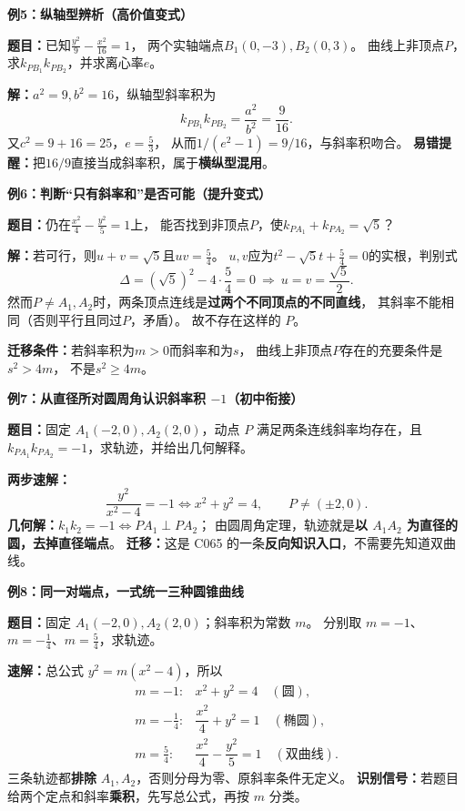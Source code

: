 \begin{examplebox}
\medskip
\textbf{\textcolor{CExample}{例5：纵轴型辨析（高价值变式）}}

\textbf{题目：}已知\(\frac{y^2}{9}-\frac{x^2}{16}=1\)，
两个实轴端点\(B_1(0,-3),B_2(0,3)\)。
曲线上非顶点\(P\)，求\(k_{PB_1}k_{PB_2}\)，并求离心率\(e\)。

\textbf{解：}\(a^2=9,b^2=16\)，纵轴型斜率积为
\[
 \boxed{k_{PB_1}k_{PB_2}=\frac{a^2}{b^2}=\frac9{16}}.
\]
又\(c^2=9+16=25\)，\(\boxed{e=\frac53}\)，
从而\(1/(e^2-1)=9/16\)，与斜率积吻合。
\textbf{易错提醒：}把\(16/9\)直接当成斜率积，属于\textbf{横纵型混用}。

\medskip
\textbf{\textcolor{CExample}{例6：判断“只有斜率和”是否可能（提升变式）}}

\textbf{题目：}仍在\(\frac{x^2}{4}-\frac{y^2}{5}=1\)上，
能否找到非顶点\(P\)，使\(k_{PA_1}+k_{PA_2}=\sqrt5\)？

\textbf{解：}若可行，则\(u+v=\sqrt5\)且\(uv=\frac54\)。
\(u,v\)应为\(t^2-\sqrt5t+\frac54=0\)的实根，判别式
\[
 \Delta=(\sqrt5)^2-4\cdot\frac54=0
 \ \Longrightarrow\ u=v=\frac{\sqrt5}{2}.
\]
然而\(P\ne A_1,A_2\)时，两条顶点连线是\textbf{过两个不同顶点的不同直线}，
其斜率不能相同（否则平行且同过\(P\)，矛盾）。
故\(\boxed{\text{不存在这样的 }P}\)。

\textbf{迁移条件：}若斜率积为\(m>0\)而斜率和为\(s\)，
曲线上非顶点\(P\)存在的充要条件是\(\boxed{s^2>4m}\)，
不是\(s^2\ge4m\)。

\medskip
\textbf{\textcolor{CExample}{例7：从直径所对圆周角认识斜率积 $-1$（初中衔接）}}

\textbf{题目：}固定 $A_1(-2,0),A_2(2,0)$，动点 $P$ 满足两条连线斜率均存在，且
$k_{PA_1}k_{PA_2}=-1$，求轨迹，并给出几何解释。

\textbf{两步速解：}
\[
 \frac{y^2}{x^2-4}=-1\iff\boxed{x^2+y^2=4},
 \qquad P\ne(\pm2,0).
\]
\textbf{几何解：}$k_1k_2=-1\iff PA_1\perp PA_2$；
由圆周角定理，轨迹就是\textbf{以 $A_1A_2$ 为直径的圆，去掉直径端点}。
\textbf{迁移：}这是 C065 的一条\textbf{反向知识入口}，不需要先知道双曲线。

\medskip
\textbf{\textcolor{CExample}{例8：同一对端点，一式统一三种圆锥曲线}}

\textbf{题目：}固定 $A_1(-2,0),A_2(2,0)$；斜率积为常数 $m$。
分别取 $m=-1$、$m=-\frac14$、$m=\frac54$，求轨迹。

\textbf{速解：}总公式 $y^2=m(x^2-4)$，所以
\[
\begin{array}{ll}
 m=-1:& \boxed{x^2+y^2=4}\quad(\text{圆}),\\[3pt]
 m=-\frac14:&\boxed{\dfrac{x^2}{4}+y^2=1}\quad(\text{椭圆}),\\[3pt]
 m=\frac54:&\boxed{\dfrac{x^2}{4}-\dfrac{y^2}{5}=1}\quad(\text{双曲线}).
\end{array}
\]
三条轨迹都\textbf{排除} $A_1,A_2$，否则分母为零、原斜率条件无定义。
\textbf{识别信号：}若题目给两个定点和斜率\textbf{乘积}，先写总公式，再按 $m$ 分类。


\end{examplebox}
